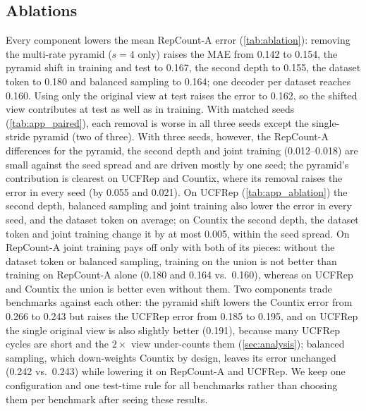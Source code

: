 \subsection{Ablations}
Every component lowers the mean RepCount-A error (\cref{tab:ablation}): removing
the multi-rate pyramid ($s{=}4$ only) raises the MAE from 0.142 to 0.154, the
pyramid shift in training and test to 0.167, the second depth to 0.155, the
dataset token to 0.180 and balanced sampling to 0.164; one decoder per dataset
reaches 0.160. Using only the original view at test raises the error to 0.162,
so the shifted view contributes at test as well as in training. With matched
seeds (\cref{tab:app_paired}), each removal is worse in all three seeds except
the single-stride pyramid (two of three). With three seeds, however, the
RepCount-A differences for the pyramid, the second depth and joint training
(0.012--0.018) are small against the seed spread and are driven mostly by one
seed; the pyramid's contribution is clearest on UCFRep and Countix, where its
removal raises the error in every seed (by 0.055 and 0.021).
On UCFRep (\cref{tab:app_ablation}) the second depth, balanced sampling and joint
training also lower the error in every seed, and the dataset token on average;
on Countix the second depth, the dataset token and joint training change it by at
most 0.005, within the seed spread. On RepCount-A joint training pays off only
with both of its pieces: without the dataset token or balanced sampling, training
on the union is not better than training on RepCount-A alone (0.180 and 0.164 vs.\
0.160), whereas on UCFRep and Countix the union is better even without them. Two
components trade benchmarks against each other: the pyramid shift lowers the
Countix error from 0.266 to 0.243 but raises the UCFRep error from 0.185 to
0.195, and on UCFRep the single original view is also slightly better (0.191),
because many UCFRep cycles are short and the $2\times$ view under-counts them
(\cref{sec:analysis}); balanced sampling, which down-weights Countix by design,
leaves its error unchanged (0.242 vs.\ 0.243) while lowering it on RepCount-A and
UCFRep. We keep one configuration and one test-time rule for all benchmarks
rather than choosing them per benchmark after seeing these results.
